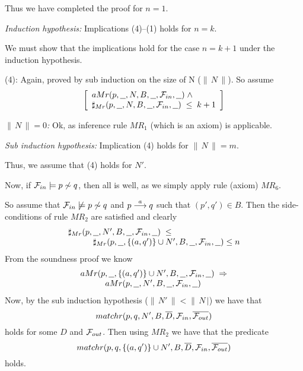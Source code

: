 \begin{theorem}
\begin{trivlist}
\noindent
Thus we have completed the proof for $n=1$.

\end{trivlist}

\noindent
{\it Induction hypothesis:\/} Implications (4)--(1) holds for $n = k$.\hfill\hbox{}\hfill\hbox{}\linebreak[4]

We must show that the implications hold for the case $n=k+1$ under the induction hypothesis.

\begin{trivlist}
\setlength{\labelwidth}{1.1cm}
\item[\rm (4):] 
Again, proved by sub induction on the size of N ($\|\,N\,\|$). So assume
\[\left[
\begin{array}{l}
aMr(p,\underline{\ \ },N,B,\underline{\ \ },{\cal F}_{in},\underline{\ \ })\;\wedge\\
\sharp_{Mr}(p,\underline{\ \ },N,B,\underline{\ \ },{\cal F}_{in},\underline{\ \ })\;\leq\;k+1
\end{array}
\right]\]

\noindent
{\it $\|\,N\,\|=0$:\/} Ok, as inference rule $MR_1$ (which is an axiom) is applicable.\hfill\hbox{}\linebreak[4]

\noindent
{\it Sub induction hypothesis:\/} Implication (4) holds for $\|\,N\,\| = m$.\hfill\hbox{}\hfill\hbox{}\linebreak[4]

\noindent
Thus, we assume that (4) holds for $N'$.

\noindent
Now, if ${\cal F}_{in}\models p\not\sim q$, then all is well, as we simply apply rule (axiom) $MR_6$.

\noindent
So assume that ${\cal F}_{in}\not\models p\not\sim q$ and $p\stackrel{a}{\longrightarrow}q$ such that $(p',q')\in B$. Then the side-conditions of rule $MR_2$ are satisfied and clearly
\[
\begin{array}{llll}
\multicolumn{4}{l}{\sharp_{Mr}(p,\underline{\ \ },N',B,\underline{\ \ },{\cal F}_{in},\underline{\ \ })\;\leq}\\
&&&\sharp_{Mr}(p,\underline{\ \ },\{(a,q')\}\cup N',B,\underline{\ \ },{\cal F}_{in},\underline{\ \ }) \leq n
\end{array}
\]
From the soundness proof we know
\[
\begin{array}{llll}
\multicolumn{4}{l}{aMr(p,\underline{\ \ },\{(a,q')\}\cup N',B,\underline{\ \ },{\cal F}_{in},\underline{\ \ })\;\Rightarrow}\\
&&& aMr(p,\underline{\ \ },N',B,\underline{\ \ },{\cal F}_{in},\underline{\ \ })
\end{array}
\]
Now, by the sub induction hypothesis ($\|\,N'\,\|<\|\,N\,|$) we have that
\[
matchr(p,q,N',B,\overline{D},{\cal F}_{in},\overline{{\cal F}_{out}})
\]
holds for some $D$ and ${\cal F}_{out}$. Then using $MR_2$ we have that the predicate
\[
matchr(p,q,\{(a,q')\}\cup N',B,\overline{D},{\cal F}_{in},\overline{{\cal F}_{out}})
\]
holds.


\end{trivlist}
\end{theorem}

